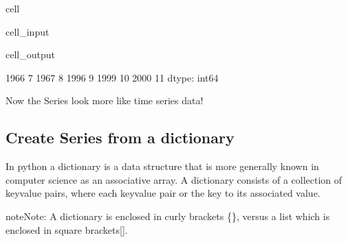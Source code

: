 \documentclass[letterpaper,10pt,english]{jupyterBook}
\begin{document}
\begin{sphinxuseclass}{cell}\begin{sphinxVerbatimInput}

\begin{sphinxuseclass}{cell_input}
\begin{sphinxVerbatim}[commandchars=\\\{\}]
\PYG{p}{[}\PYG{p}{]}
\end{sphinxVerbatim}

\end{sphinxuseclass}\end{sphinxVerbatimInput}
\begin{sphinxVerbatimOutput}

\begin{sphinxuseclass}{cell_output}
\begin{sphinxVerbatim}[commandchars=\\\{\}]
1966     7
1967     8
1996     9
1999    10
2000    11
dtype: int64
\end{sphinxVerbatim}

\end{sphinxuseclass}\end{sphinxVerbatimOutput}

\end{sphinxuseclass}
\sphinxAtStartPar
Now the Series look more like time series data!


\subsection{Create Series from a dictionary}
\label{\detokenize{content/04_PythonEssentials/PythonPandasDataframes:create-series-from-a-dictionary}}
\sphinxAtStartPar
In python a dictionary is a data structure that is more generally known in computer science as an associative array. A dictionary consists of a collection of key\sphinxhyphen{}value pairs, where each key\sphinxhyphen{}value pair  or  the key to its associated value.

\begin{sphinxadmonition}{note}{Note:}
\sphinxAtStartPar
A dictionary is enclosed in curly brackets \{\}, versus a list which is enclosed in square brackets{[}{]}.
\end{sphinxadmonition}
\end{document}
